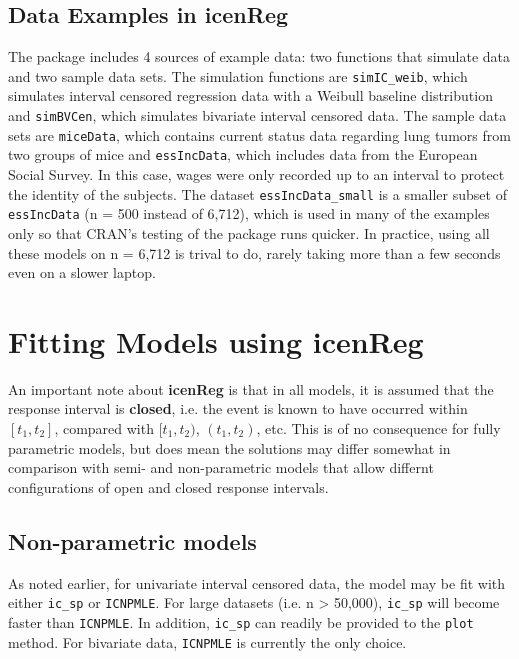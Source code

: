 \documentclass[11pt]{report}
\begin{document}
  
  \section{Data Examples in {\bf{icenReg}} }
  
  The package includes 4 sources of example data: two functions that simulate data and
  two sample data sets. The simulation functions are \texttt{simIC\_weib}, which simulates
  interval censored regression data with a Weibull baseline distribution and 
  \texttt{simBVCen}, which simulates bivariate interval censored data. The sample data sets
  are \texttt{miceData}, which contains current status data regarding lung tumors 
  from two groups of mice and \texttt{essIncData}, which includes data from the European
  Social Survey. In this case, wages were only recorded up to an interval to 
  protect the identity of the subjects. The dataset \texttt{essIncData\_small} is a smaller
  subset of \texttt{essIncData} (n = 500 instead of 6,712), which is used in many of 
  the examples only so that CRAN's testing of the package runs quicker. In practice,
  using all these models on n = 6,712 is trival to do, rarely taking more than a few seconds
  even on a slower laptop. 
  
  
  \chapter{Fitting Models using {\bf{icenReg}} }
  
  An important note about {\bf icenReg} is that in all models, it is assumed that the 
  response interval is {\bf closed}, i.e. the event is known to have occurred within 
  $[t_1, t_2]$, compared with $[t_1, t_2)$, $(t_1, t_2)$, etc. This is of no consequence 
  for fully parametric models, but does mean the solutions may differ somewhat in 
  comparison with semi- and non-parametric models that allow differnt configurations
  of open and closed response intervals. 
  
  \section{Non-parametric models}
  
  As noted earlier, for univariate interval censored data, the model may be fit with either
  \texttt{ic\_sp} or \texttt{ICNPMLE}. For large datasets (i.e. n > 50,000), \texttt{ic\_sp} 
  will become faster than \texttt{ICNPMLE}. In addition, \texttt{ic\_sp} can readily be 
  provided to the \texttt{plot} method. For bivariate data, \texttt{ICNPMLE} is currently
  the only choice. 
  
\end{document}
